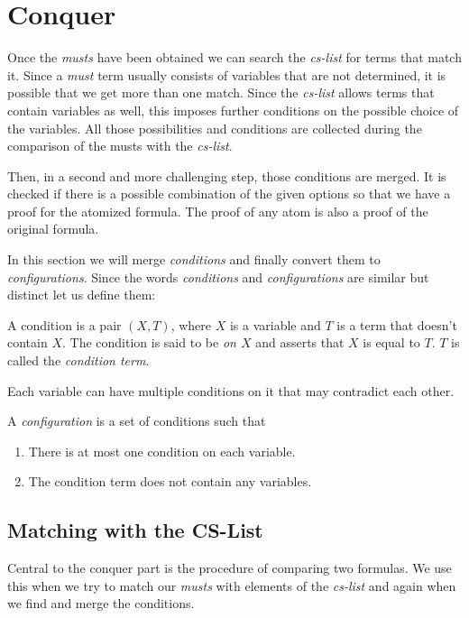 \section{Conquer}

Once the \emph{musts} have been obtained we can search the \emph{cs-list} for terms that match it. Since a \emph{must} term usually consists of variables that are not determined, it is possible that we get more than one match. Since the \emph{cs-list} allows terms that contain variables as well, this imposes further conditions on the possible choice of the variables. All those possibilities and conditions are collected during the comparison of the musts with the \emph{cs-list}.

Then, in a second and more challenging step, those conditions are merged. It is checked if there is a possible combination of the given options so that we have a proof for the atomized formula. The proof of any atom is also a proof of the original formula.

In this section we will merge \emph{conditions} and finally convert them to \emph{configurations}. Since the words \emph{conditions} and \emph{configurations} are similar but distinct let us define them:

\begin{definition}[condition]
A condition is a pair $(X, T)$, where $X$ is a variable and $T$ is a term that doesn't contain $X$. The condition is said to be \emph{on $X$} and asserts that $X$ is equal to $T$. $T$ is called the \emph{condition term}.
\end{definition}
Each variable can have multiple conditions on it that may contradict each other.

\begin{definition}[configuration]
A \emph{configuration} is a set of conditions such that
\begin{enumerate}
	\item There is at most one condition on each variable.
	\item The condition term does not contain any variables.
\end{enumerate}
\end{definition}

\subsection{Matching with the CS-List}
Central to the conquer part is the procedure of comparing two formulas. We use this when we try to match our \emph{musts} with elements of the \emph{cs-list} and  again when we find and merge the conditions.

